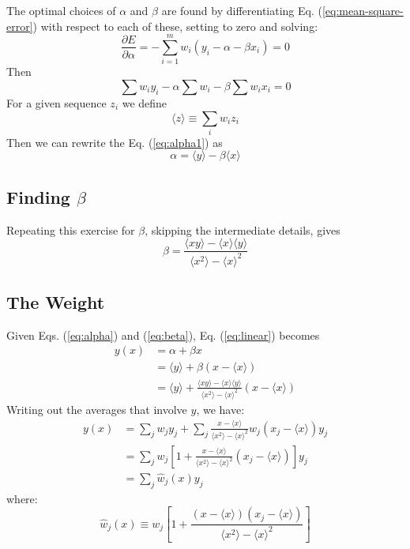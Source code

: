 \documentclass[oneside]{tufte-handout}
\begin{document}
\begin{fullwidth}
The optimal choices of $\alpha$ and $\beta$ are found by differentiating Eq. (\ref{eq:mean-square-error}) with respect to each of these, setting to zero and solving:
\begin{equation}
\frac{\partial E}{\partial \alpha} = - \sum_{i=1}^m w_i (y_i - \alpha - \beta x_i) = 0
\end{equation}
Then
\begin{equation}\label{eq:alpha1}
\sum w_i y_i - \alpha \sum w_i - \beta \sum w_i x_i = 0
\end{equation}
For a given sequence ${z_i}$ we define
\begin{equation}\label{eq:avg-def}
	\langle z \rangle \equiv \sum_i w_i z_i
\end{equation}
Then we can rewrite the Eq. (\ref{eq:alpha1}) as
\begin{equation}\label{eq:alpha}
\alpha = \langle y \rangle - \beta \langle x \rangle
\end{equation}

\subsection{Finding $\beta$}

Repeating this exercise for $\beta$, skipping the intermediate details, gives
\begin{equation}\label{eq:beta}
\beta = \frac{\langle x y \rangle - \langle x \rangle \langle y \rangle}{\langle x^2 \rangle - \langle x \rangle^2}
\end{equation}

\subsection{The Weight}

Given Eqs. (\ref{eq:alpha}) and (\ref{eq:beta}),  Eq. (\ref{eq:linear}) becomes
\begin{align}
y(x) &= \alpha + \beta x \\
       &= \langle y \rangle + \beta ( x - \langle x \rangle) \\
       &= \langle y \rangle + \frac{\langle x y \rangle - \langle x \rangle \langle y \rangle}{\langle x^2 \rangle - \langle x \rangle^2} (x - \langle x \rangle)
\end{align}
Writing out the averages that involve $y$, we have:
\begin{align}
y(x) &= \sum_j w_j y_j + \sum_j \frac{x - \langle x \rangle}{\langle x^2 \rangle - \langle x \rangle^2} w_j (x_j - \langle x \rangle)y_j  \\
       &= \sum_j w_j \left[1 + \frac{x - \langle x \rangle}{\langle x^2 \rangle - \langle x \rangle^2}(x_j - \langle x \rangle) \right] y_j \\
       &= \sum_j \hat{w}_j(x) y_j
\end{align}
where:
\begin{equation}\label{eq:linear-weight}
\hat{w}_j(x) \equiv w_j\left[ 1 + \frac{(x - \langle x \rangle)(x_j - \langle x \rangle)}{\langle x^2 \rangle - \langle x \rangle^2} \right]
\end{equation}


\end{fullwidth}
\end{document}
